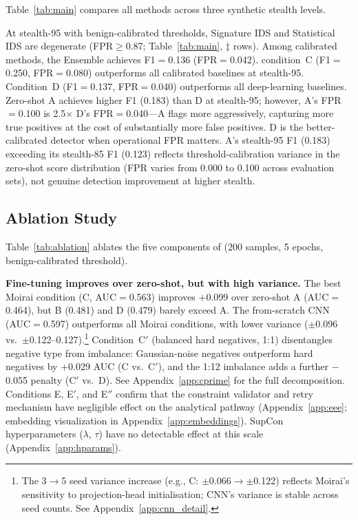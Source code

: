 Table~\ref{tab:main} compares all methods across three synthetic stealth levels.



At stealth-95 with benign-calibrated thresholds, Signature IDS and
Statistical IDS are degenerate (FPR$\geq$0.87; Table~\ref{tab:main},
$\ddagger$ rows).  Among calibrated methods, the Ensemble achieves
F1$=$0.136 (FPR$=$0.042).
\ours{} condition~C (F1$=$0.250, FPR$=$0.080) outperforms all calibrated
baselines at stealth-95.
Condition~D (F1$=$0.137, FPR$=$0.040) outperforms all deep-learning baselines.
Zero-shot A achieves higher F1 (0.183) than D at stealth-95; however,
A's FPR$=$0.100 is 2.5$\times$ D's FPR$=$0.040---A flags more aggressively,
capturing more true positives at the cost of substantially more false positives.
D is the better-calibrated detector when operational FPR matters.
A's stealth-95 F1 (0.183) exceeding its stealth-85 F1 (0.123) reflects
threshold-calibration variance in the zero-shot score distribution
(FPR varies from 0.000 to 0.100 across evaluation sets), not genuine
detection improvement at higher stealth.

\subsection{Ablation Study}
\label{sec:experiments:ablation}

Table~\ref{tab:ablation} ablates the five components of \ours{} (200
samples, 5 epochs, benign-calibrated threshold).



\textbf{Fine-tuning improves over zero-shot, but with high variance.}
The best Moirai condition (C, AUC$=$0.563) improves $+$0.099 over
zero-shot A (AUC$=$0.464), but B (0.481) and D (0.479) barely exceed A.
The from-scratch CNN (AUC$=$0.597) outperforms all Moirai conditions,
with lower variance ($\pm$0.096 vs.\ $\pm$0.122--0.127).\footnote{%
  The 3$\to$5 seed variance increase (e.g., C: $\pm$0.066$\to$$\pm$0.122)
  reflects Moirai's sensitivity to projection-head initialisation;
  CNN's variance is stable across seed counts.  See Appendix~\ref{app:cnn_detail}.}
Condition~C$'$ (balanced hard negatives, 1:1) disentangles negative type from
imbalance: Gaussian-noise negatives outperform hard negatives by $+$0.029 AUC
(C vs.\ C$'$), and the 1:12 imbalance adds a further $-$0.055 penalty (C$'$ vs.\ D).
See Appendix~\ref{app:cprime} for the full decomposition.
Conditions E, E$'$, and E$''$ confirm that the constraint validator and
retry mechanism have negligible effect on the analytical pathway
(Appendix~\ref{app:eee}; embedding visualization in Appendix~\ref{app:embeddings}).
SupCon hyperparameters ($\lambda$, $\tau$) have no detectable effect at
this scale (Appendix~\ref{app:hparams}).

